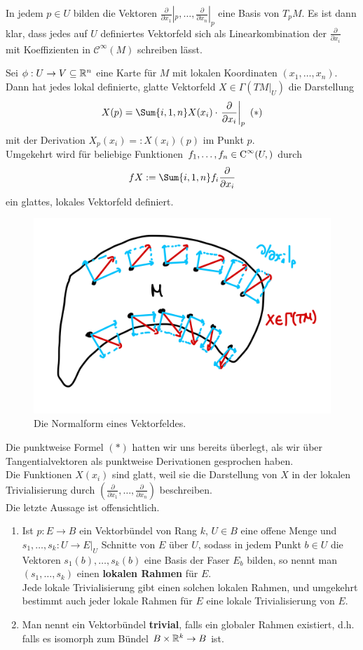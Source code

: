 In jedem $p \in U$ bilden die Vektoren $\frac{\partial}{\partial x_1}|_p, \dots, \frac{\partial}{\partial x_n}|_p$ eine Basis von $T_pM$. Es ist dann klar, dass jedes auf $U$ definiertes Vektorfeld sich als Linearkombination der $\frac{\partial}{\partial x_i}$ mit Koeffizienten in $\mathcal{C}^\infty (M)$ schreiben lässt.
\begin{satz}{}{}
Sei $\phi: U \to V \subseteq \mathbb{R}^n$ eine Karte für $M$ mit lokalen Koordinaten $(x_1, \dots, x_n)$. Dann hat jedes lokal definierte, glatte Vektorfeld $X \in \Gamma(TM|_U)$ die Darstellung
\begin{equation}
X(p) = \Sum{i,1,n} X(x_i) \cdot \left.\frac{\partial}{\partial x_i}\right|_p \ (\ast)
\end{equation}
mit der Derivation $X_p(x_i) =: X(x_i)(p)$ im Punkt $p$.\\
Umgekehrt wird für beliebige Funktionen $f_1, \dots, f_n \in \cinf{U}{}$ durch
\begin{equation}
fX := \Sum{i,1,n} f_i \frac{\partial}{\partial x_i}
\end{equation}
ein glattes, lokales Vektorfeld definiert.
\begin{figure}[H]
\label{fig:normalformvek}
\centering
\includegraphics[width=0.25\linewidth]{Bilder/normalformvek.png}
\caption{Die Normalform eines Vektorfeldes.}
\end{figure}
\end{satz}
\begin{beweis}
Die punktweise Formel $(\ast)$ hatten wir uns bereits überlegt, als wir über Tangentialvektoren als punktweise Derivationen gesprochen haben.\\
Die Funktionen $X(x_i)$ sind glatt, weil sie die Darstellung von $X$ in der lokalen Trivialisierung durch $\left( \frac{\partial}{\partial x_1}, \dots, \frac{\partial}{\partial x_n} \right)$ beschreiben.\\
Die letzte Aussage ist offensichtlich.
\end{beweis}
\begin{bemerkungen}
\begin{enumerate}
\item Ist $p: E \to B$ ein Vektorbündel von Rang $k$, $U \in B$ eine offene Menge und $s_1, \dots, s_k: U \to E|_U$ Schnitte von $E$ über $U$, sodass in jedem Punkt $b \in U$ die Vektoren $s_1(b), \dots, s_k(b)$ eine Basis der Faser $E_b$ bilden, so nennt man $(s_1, \dots, s_k)$ einen \textbf{lokalen Rahmen} für $E$.\\
Jede lokale Trivialisierung gibt einen solchen lokalen Rahmen, und umgekehrt bestimmt auch jeder lokale Rahmen für $E$ eine lokale Trivialisierung von $E$.
\item Man nennt ein Vektorbündel \textbf{trivial}, falls ein globaler Rahmen existiert, d.h. falls es isomorph zum Bündel $B \times \mathbb{R}^k \to B$ ist.
\end{enumerate}
\end{bemerkungen}

